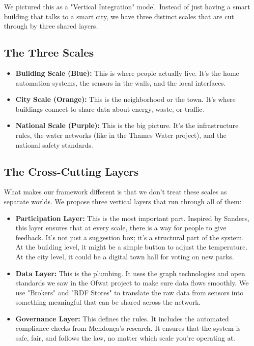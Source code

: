 \documentclass[a4paper,oneside,12pt]{report}
\begin{document}
We pictured this as a "Vertical Integration" model. Instead of just having a smart building that talks to a smart city, we have three distinct scales that are cut through by three shared layers.

\subsection{The Three Scales}
\begin{itemize}
    \item \textbf{Building Scale (Blue):} This is where people actually live. It's the home automation systems, the sensors in the walls, and the local interfaces.
    \item \textbf{City Scale (Orange):} This is the neighborhood or the town. It's where buildings connect to share data about energy, waste, or traffic.
    \item \textbf{National Scale (Purple):} This is the big picture. It's the infrastructure rules, the water networks (like in the Thames Water project), and the national safety standards.
\end{itemize}

\subsection{The Cross-Cutting Layers}
What makes our framework different is that we don't treat these scales as separate worlds. We propose three vertical layers that run through all of them:

\begin{itemize}
    \item \textbf{Participation Layer:} This is the most important part. Inspired by Sanders\cite{Sanders2008}, this layer ensures that at every scale, there is a way for people to give feedback. It's not just a suggestion box; it's a structural part of the system. At the building level, it might be a simple button to adjust the temperature. At the city level, it could be a digital town hall for voting on new parks.
    \item \textbf{Data Layer:} This is the plumbing. It uses the graph technologies and open standards we saw in the Ofwat project\cite{ThamesWater2024} to make sure data flows smoothly. We use "Brokers" and "RDF Stores" to translate the raw data from sensors into something meaningful that can be shared across the network.
    \item \textbf{Governance Layer:} This defines the rules. It includes the automated compliance checks from Mendonça's research\cite{Mendonca2024}. It ensures that the system is safe, fair, and follows the law, no matter which scale you're operating at.
\end{itemize}
\end{document}
